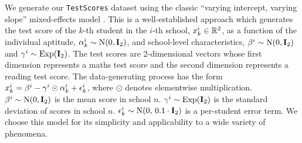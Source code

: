 \documentclass[../thesis.tex]{subfiles}
\begin{document}


We generate our \texttt{TestScores} dataset using the classic ``varying intercept, varying slope'' mixed-effects model \citep{lairdRandomeffectsModelsLongitudinal1982,pinheiroMixedEffectsModelsSPLUS2001,gelmanDataAnalysisUsing2006}. This is a well-established approach which generates the test score of the $k$-th student in the $i$-th school, $x^i_{k} \in \mathbb{R}^2$, as a function of the individual aptitude, $\alpha^i_{k} \sim \mathrm{N}(0, \mymatrix{i}_2)$, and school-level characteristics, $\beta^i \sim \mathrm{N}(0, \mymatrix{i}_2)$ and $\gamma^i \sim \mathrm{Exp}(\mymatrix{i}_2)$. The test scores are 2-dimensional vectors whose first dimension represents a maths test score and the second dimension represents a reading test score. The data-generating process has the form $x^i_k = \beta^i - \gamma^i \odot \alpha^i_k + \epsilon^i_k$, where $\odot$ denotes elementwise multiplication. $\beta^i \sim \mathrm{N} (0,\mymatrix{i}_2)$ is the mean score in school $n$. $\gamma^i \sim \mathrm{Exp} (\mymatrix{i}_2)$ is the standard deviation of scores in school $n$. $\epsilon^i_k \sim \mathrm{N} (0,\, 0.1 \cdot \mymatrix{i}_2)$ is a per-student error term. We choose this model for its simplicity and applicability to a wide variety of phenomena. 

\end{document}
